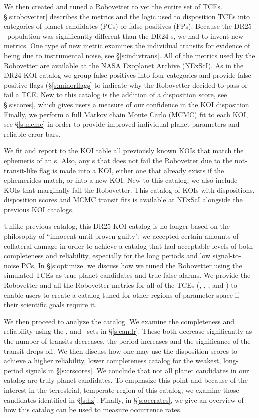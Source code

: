 We then created and tuned a Robovetter to vet the entire set of TCEs. \S\ref{s:robovetter} describes the metrics and the logic used to disposition TCEs into categories of planet candidates (PCs) or false positives (FPs). Because the DR25 \opstce\ population was significantly different than the DR24 \opstce s, we had to invent new metrics. One type of new metric examines the individual transits for evidence of being due to instrumental noise, see \S\ref{s:indivtrans}.  All of the metrics used by the Robovetter are available at the NASA Exoplanet Archive (NExScI). As in the DR24 KOI catalog we group false positives into four categories and provide false positive flags (\S\ref{s:minorflags} to indicate why the Robovetter decided to pass or fail a TCE.  New to this catalog is the addition of a disposition score, see \S\ref{s:scores}, which gives users a measure of our confidence in the KOI disposition. Finally, we perform a full Markov chain Monte Carlo (MCMC) fit to each KOI, see \S\ref{s:mcmc} in order to provide improved individual planet parameters and reliable error bars.

We fit and report to the KOI table all previously known KOIs that match the ephemeris of an \opstce s. Also, any \opstce s that does not fail the Robovetter due to the not-transit-like flag is made into a KOI, either one that already exists if the ephemerides match, or into a new KOI. New to this catalog, we also include KOIs that marginally fail the Robovetter.   This catalog of KOIs with dispositions, disposition scores and MCMC transit fits is available at NExScI alongside the previous KOI catalogs.

Unlike previous catalog, this DR25 KOI catalog is no longer based on the philosophy of ``innocent until proven guilty"; we accepted certain amounts of collateral damage in order to achieve a catalog that had acceptable levels of both completeness and reliability, especially for the long periods and low signal-to-noise PCs. In \S\ref{s:optimize} we discuss how we tuned the Robovetter using the simulated TCEs as true planet candidates and true false alarms. We provide the Robovetter and all the Robovetter metrics for all of the TCEs (\opstce, \injtce, \invtce, and \scrtce) to enable users to create a catalog tuned for other regions of parameter space if their scientific goals require it. 

We then proceed to analyze the catalog.  We examine the completeness and reliability using the \injtce, \invtce and \scrtce\ sets in \S\ref{s:candr}. These both decrease significantly as the number of transits decreases, the period increases and the significance of the transit drops-off.  We then discuss how one may use the disposition scores to achieve a higher reliability, lower completeness catalog for the weakest, long-period signals in \S\ref{s:crscores}.  We conclude that not all planet candidates in our catalog are truly planet candidates. To emphasize this point and because of the interest in the terrestrial, temperate region of this catalog, we examine those candidates identified in \S\ref{s:hz}. Finally, in \S\ref{s:occrates}, we give an overview of how this catalog can be used to measure occurrence rates.




